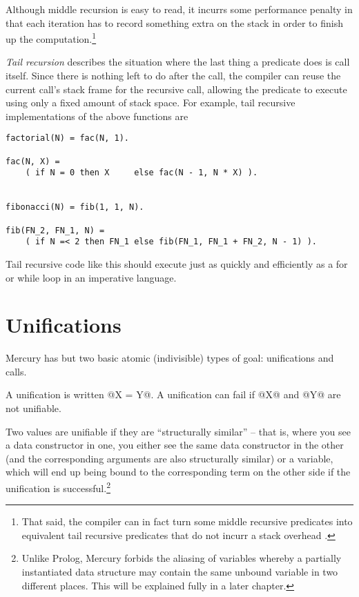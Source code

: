 Although middle recursion is easy to read, it incurrs some
performance penalty in that each iteration has to record
something extra on the stack in order to finish up the
computation.\footnote{That said, the compiler can in fact turn some
middle recursive predicates into equivalent tail recursive
predicates that do not incurr a stack overhead \XXX{}.}


\emph{Tail recursion} describes the situation where the last thing a
predicate does is call itself.  Since there is nothing left to
do after the call, the compiler can reuse the current call's
stack frame for the recursive call, allowing the predicate to
execute using only a fixed amount of stack space.  For
example, tail recursive implementations of the above
functions are
\begin{verbatim}
factorial(N) = fac(N, 1).

fac(N, X) =
    ( if N = 0 then X     else fac(N - 1, N * X) ).


fibonacci(N) = fib(1, 1, N).

fib(FN_2, FN_1, N) =
    ( if N =< 2 then FN_1 else fib(FN_1, FN_1 + FN_2, N - 1) ).
\end{verbatim}
Tail recursive code like this should execute just as quickly
and efficiently as a for or while loop in an imperative
language.

\section{Unifications}

Mercury has but two basic atomic (\ie indivisible) types of
goal: unifications and calls.

A unification is written @X = Y@.  A unification can fail if @X@
and @Y@ are not unifiable.

Two values are unifiable if they are ``structurally similar'' --
that is, where you see a data constructor in one, you either
see the same data constructor in the other (and the
corresponding arguments are also structurally similar) or a
variable, which will end up being bound to the corresponding
term on the other side if the unification is successful.\footnote{Unlike Prolog, Mercury forbids the aliasing of
variables whereby a partially instantiated data structure
may contain the same unbound variable in two different places.
This will be explained fully in a later chapter.  \XXX{}}

